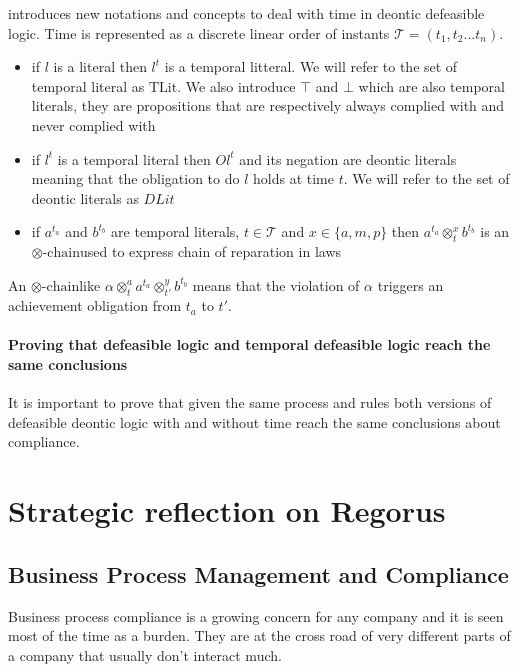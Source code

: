 \documentclass[10pt]{report}
\newcommand{\ochain}{$\otimes \text{-chain}$}
\begin{document}
\autocite{JusticeDelayed2011} introduces new notations and concepts to deal with time in deontic defeasible logic. Time is represented as a discrete linear order of instants $ \mathscr{T} = (t_{1}, t_{2} ... t_{n})$.
\begin{itemize}
\item if $l$ is a literal then $l^{t}$ is a temporal litteral. We will refer to the set of temporal literal as $\text{TLit}$. We also introduce $\top$ and $\bot$ which are also temporal literals, they are propositions that are respectively always complied with and never complied with
\item if $l^{t}$ is a temporal literal then $Ol^{t}$ and its negation are deontic literals meaning that the obligation to do $l$ holds at time $t$. We will refer to the set of deontic literals as $DLit$
\item if $a^{t_{a}}$ and $b^{t_{b}}$ are temporal literals, $t \in \mathscr{T}$ and $x \in \{a,m,p\}$ then $a^{t_{a}} \otimes^{x}_{t} b^{t_{b}}$ is an \ochain used to express chain of reparation in laws
\end{itemize} 


An \ochain like $\alpha \otimes^{a}_{t} a^{t_{a}} \otimes^{y}_{t'} b^{t_{b}}$ means that the violation of $\alpha$ triggers an achievement obligation from $t_{a}$ to $t'$.

\subsubsection{Proving that defeasible logic and temporal defeasible logic reach the same conclusions}

It is important to prove that given the same process and rules both versions of defeasible deontic logic with and without time reach the same conclusions about compliance.



\newpage
\chapter{Strategic reflection on Regorus}

\section{Business Process Management and Compliance}
Business process compliance is a growing concern for any company and it is seen most of the time as a burden.  They are at the cross road of very different parts of a company that usually don't interact much.
\end{document}
